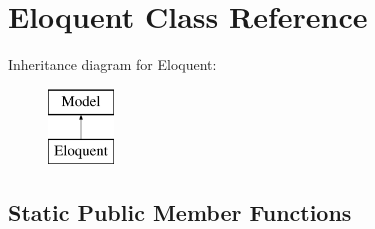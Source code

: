 \hypertarget{class_eloquent}{}\section{Eloquent Class Reference}
\label{class_eloquent}
Inheritance diagram for Eloquent\+:\begin{figure}[H]
\begin{center}
\leavevmode
\includegraphics[height=2.000000cm]{class_eloquent}
\end{center}
\end{figure}
\subsection*{Static Public Member Functions}
